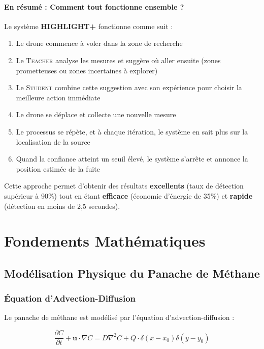 \documentclass[12pt,a4paper]{article}
\newcommand{\highlight}{\textbf{HIGHLIGHT+}}
\newcommand{\teacher}{\textsc{Teacher}}
\newcommand{\student}{\textsc{Student}}
\begin{document}
\paragraph{En résumé : Comment tout fonctionne ensemble ?}

Le système \highlight{} fonctionne comme suit :
\begin{enumerate}
    \item Le drone commence à voler dans la zone de recherche
    \item Le \teacher{} analyse les mesures et suggère où aller ensuite (zones prometteuses ou zones incertaines à explorer)
    \item Le \student{} combine cette suggestion avec son expérience pour choisir la meilleure action immédiate
    \item Le drone se déplace et collecte une nouvelle mesure
    \item Le processus se répète, et à chaque itération, le système en sait plus sur la localisation de la source
    \item Quand la confiance atteint un seuil élevé, le système s'arrête et annonce la position estimée de la fuite
\end{enumerate}

Cette approche permet d'obtenir des résultats \textbf{excellents} (taux de détection supérieur à 90\%) tout en étant \textbf{efficace} (économie d'énergie de 35\%) et \textbf{rapide} (détection en moins de 2,5 secondes).

\section{Fondements Mathématiques}

\subsection{Modélisation Physique du Panache de Méthane}

\subsubsection{Équation d'Advection-Diffusion}

Le panache de méthane est modélisé par l'équation d'advection-diffusion :

\begin{equation}
\frac{\partial C}{\partial t} + \mathbf{u} \cdot \nabla C = D \nabla^2 C + Q \cdot \delta(x - x_0) \delta(y - y_0)
\end{equation}
\end{document}
